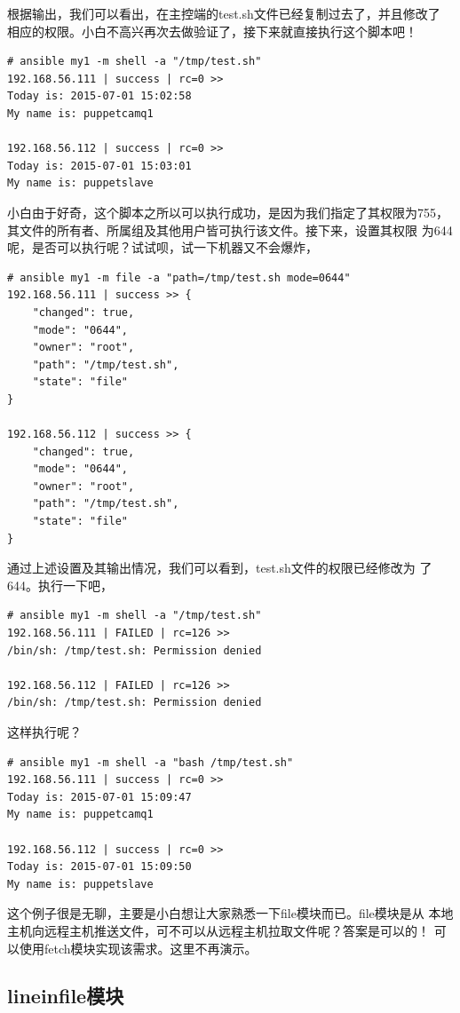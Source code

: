 根据输出，我们可以看出，在主控端的test.sh文件已经复制过去了，并且修改了
相应的权限。小白不高兴再次去做验证了，接下来就直接执行这个脚本吧！
\begin{verbatim}
# ansible my1 -m shell -a "/tmp/test.sh"
192.168.56.111 | success | rc=0 >>
Today is: 2015-07-01 15:02:58
My name is: puppetcamq1

192.168.56.112 | success | rc=0 >>
Today is: 2015-07-01 15:03:01
My name is: puppetslave
\end{verbatim}
小白由于好奇，这个脚本之所以可以执行成功，是因为我们指定了其权限为755，
其文件的所有者、所属组及其他用户皆可执行该文件。接下来，设置其权限
为644呢，是否可以执行呢？试试呗，试一下机器又不会爆炸，
\begin{verbatim}
# ansible my1 -m file -a "path=/tmp/test.sh mode=0644"
192.168.56.111 | success >> {
    "changed": true, 
    "mode": "0644", 
    "owner": "root", 
    "path": "/tmp/test.sh", 
    "state": "file"
}

192.168.56.112 | success >> {
    "changed": true, 
    "mode": "0644", 
    "owner": "root", 
    "path": "/tmp/test.sh", 
    "state": "file"
}
\end{verbatim}
通过上述设置及其输出情况，我们可以看到，test.sh文件的权限已经修改为
了644。执行一下吧，
\begin{verbatim}
# ansible my1 -m shell -a "/tmp/test.sh"
192.168.56.111 | FAILED | rc=126 >>
/bin/sh: /tmp/test.sh: Permission denied

192.168.56.112 | FAILED | rc=126 >>
/bin/sh: /tmp/test.sh: Permission denied
\end{verbatim}

这样执行呢？

\begin{verbatim}
# ansible my1 -m shell -a "bash /tmp/test.sh"
192.168.56.111 | success | rc=0 >>
Today is: 2015-07-01 15:09:47
My name is: puppetcamq1

192.168.56.112 | success | rc=0 >>
Today is: 2015-07-01 15:09:50
My name is: puppetslave
\end{verbatim}
这个例子很是无聊，主要是小白想让大家熟悉一下file模块而已。file模块是从
本地主机向远程主机推送文件，可不可以从远程主机拉取文件呢？答案是可以的！
可以使用fetch模块实现该需求。这里不再演示。

\subsection{lineinfile模块}
\label{AnsibleLineinfileMod}

